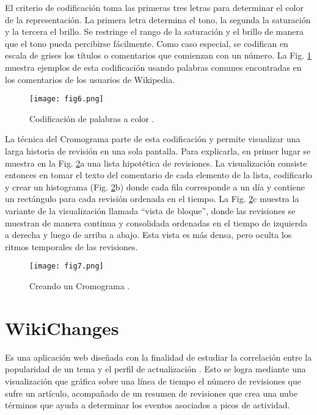 El criterio de codificación toma las primeras tres letras para determinar el color de la representación. La primera letra determina el tono, la segunda la saturación y la tercera el brillo. Se restringe el rango de la saturación y el brillo de manera que el tono pueda percibirse fácilmente. Como caso especial, se codifican en escala de grises los títulos o comentarios que comienzan con un número. La Fig. \ref{fig:fig6} muestra ejemplos de esta codificación usando palabras comunes encontradas en los comentarios de los usuarios de Wikipedia.

\begin{figure}[htp]
  \centering
  \texttt{[image: fig6.png]}
  \caption[Codificación de palabras a color]{Codificación de palabras a color \cite[Fig. 1]{Wat07}.}
  \label{fig:fig6}
\end{figure}

La técnica del Cromograma parte de esta codificación y permite visualizar una larga historia de revisión en una sola pantalla. Para explicarla, en primer lugar se muestra en la Fig. \ref{fig:fig7}a una lista hipotética de revisiones. La visualización consiste entonces en tomar el texto del comentario de cada elemento de la lista, codificarlo y crear un histograma (Fig. \ref{fig:fig7}b) donde cada fila corresponde a un día y contiene un rectángulo para cada revisión ordenada en el tiempo. La Fig. \ref{fig:fig7}c muestra la variante de la visualización llamada “vista de bloque”, donde las revisiones se muestran de manera continua y consolidada ordenadas en el tiempo de izquierda a derecha y luego de arriba a abajo. Esta vista es más densa, pero oculta los ritmos temporales de las revisiones.

\begin{figure}[htp]
  \centering
  \texttt{[image: fig7.png]}
  \caption[Creando un Cronograma]{Creando un Cromograma \cite[Fig. 2]{Wat07}.}
  \label{fig:fig7}
\end{figure}

\section{WikiChanges}
Es una aplicación web diseñada con la finalidad de estudiar la correlación entre la popularidad de un tema y el perfil de actualización \cite{Nun08}. Esto se logra mediante una visualización que gráfica sobre una línea de tiempo el número de revisiones que sufre un artículo, acompañado de un resumen de revisiones que crea una nube términos que ayuda a determinar los eventos asociados a picos de actividad.

